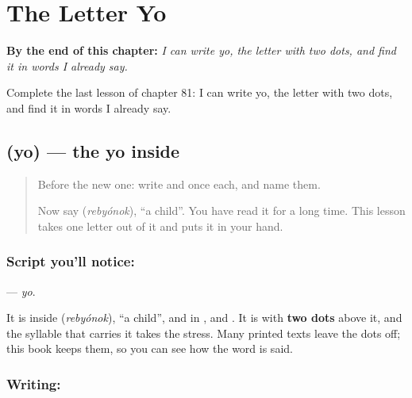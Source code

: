 
\chapter{The Letter Yo}
\label{ch:ru-letter-yo}

\begin{chapteropening}
\textbf{By the end of this chapter:} \emph{I can write yo, the letter with two dots, and find it in words I already say.}

Complete the last lesson of chapter 81: I can write yo, the letter with two dots, and find it in words I already say.
\end{chapteropening}

\section[\texorpdfstring{\ru{ё} (yo)}{ё (yo)}]{ (yo) — the yo inside }

\label{lesson:RU-W81-yo}



\begin{quote}
Before the new one: write  and  once each, and name them.

Now say \textbf{} (\emph{rebyónok}), \textquotedblleft{}a child\textquotedblright{}. You have read it for a long time. This lesson takes one letter out of it and puts it in your hand.
\end{quote}

\subsection*{Script you'll notice: }
\textbf{} — \emph{yo}.

It is inside \textbf{} (\emph{rebyónok}), \textquotedblleft{}a child\textquotedblright{}, and in \textbf{}, \textbf{} and \textbf{}. It is \textbf{} with \textbf{two dots} above it, and the syllable that carries it takes the stress. Many printed texts leave the dots off; this book keeps them, so you can see how the word is said.

\subsection*{Writing: }

